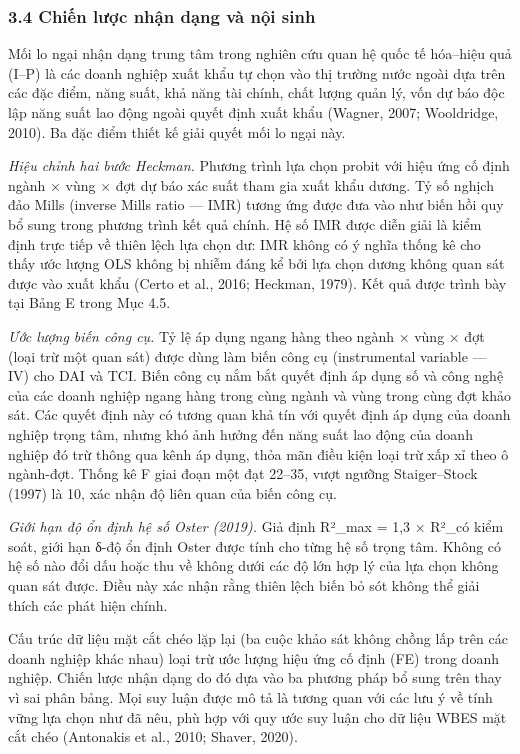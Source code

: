 \documentclass[12pt,a4paper]{article}
\begin{document}
\hypertarget{34-chiux1ebfn-lux1b0ux1ee3c-nhux1eadn-dux1ea1ng-vuxe0-nux1ed9i-sinh}{%
\subsubsection{3.4 Chiến lược nhận dạng và nội
sinh}\label{34-chiux1ebfn-lux1b0ux1ee3c-nhux1eadn-dux1ea1ng-vuxe0-nux1ed9i-sinh}}

Mối lo ngại nhận dạng trung tâm trong nghiên cứu quan hệ quốc tế
hóa--hiệu quả (I--P) là các doanh nghiệp xuất khẩu tự chọn vào thị
trường nước ngoài dựa trên các đặc điểm, năng suất, khả năng tài chính,
chất lượng quản lý, vốn dự báo độc lập năng suất lao động ngoài quyết
định xuất khẩu (Wagner, 2007; Wooldridge, 2010). Ba đặc điểm thiết kế
giải quyết mối lo ngại này.

\emph{Hiệu chỉnh hai bước Heckman.} Phương trình lựa chọn probit với
hiệu ứng cố định ngành × vùng × đợt dự báo xác suất tham gia xuất khẩu
dương. Tỷ số nghịch đảo Mills (inverse Mills ratio --- IMR) tương ứng
được đưa vào như biến hồi quy bổ sung trong phương trình kết quả chính.
Hệ số IMR được diễn giải là kiểm định trực tiếp về thiên lệch lựa chọn
dư: IMR không có ý nghĩa thống kê cho thấy ước lượng OLS không bị nhiễm
đáng kể bởi lựa chọn dương không quan sát được vào xuất khẩu (Certo et
al., 2016; Heckman, 1979). Kết quả được trình bày tại Bảng E trong Mục
4.5.

\emph{Ước lượng biến công cụ.} Tỷ lệ áp dụng ngang hàng theo ngành ×
vùng × đợt (loại trừ một quan sát) được dùng làm biến công cụ
(instrumental variable --- IV) cho DAI và TCI. Biến công cụ nắm bắt
quyết định áp dụng số và công nghệ của các doanh nghiệp ngang hàng trong
cùng ngành và vùng trong cùng đợt khảo sát. Các quyết định này có tương
quan khả tín với quyết định áp dụng của doanh nghiệp trọng tâm, nhưng
khó ảnh hưởng đến năng suất lao động của doanh nghiệp đó trừ thông qua
kênh áp dụng, thỏa mãn điều kiện loại trừ xấp xỉ theo ô ngành-đợt. Thống
kê F giai đoạn một đạt 22--35, vượt ngưỡng Staiger--Stock (1997) là 10,
xác nhận độ liên quan của biến công cụ.

\emph{Giới hạn độ ổn định hệ số Oster (2019).} Giả định R²\_max = 1,3 ×
R²\_có kiểm soát, giới hạn δ-độ ổn định Oster được tính cho từng hệ số
trọng tâm. Không có hệ số nào đổi dấu hoặc thu về không dưới các độ lớn
hợp lý của lựa chọn không quan sát được. Điều này xác nhận rằng thiên
lệch biến bỏ sót không thể giải thích các phát hiện chính.

Cấu trúc dữ liệu mặt cắt chéo lặp lại (ba cuộc khảo sát không chồng lấp
trên các doanh nghiệp khác nhau) loại trừ ước lượng hiệu ứng cố định
(FE) trong doanh nghiệp. Chiến lược nhận dạng do đó dựa vào ba phương
pháp bổ sung trên thay vì sai phân bảng. Mọi suy luận được mô tả là
tương quan với các lưu ý về tính vững lựa chọn như đã nêu, phù hợp với
quy ước suy luận cho dữ liệu WBES mặt cắt chéo (Antonakis et al., 2010;
Shaver, 2020).
\end{document}
